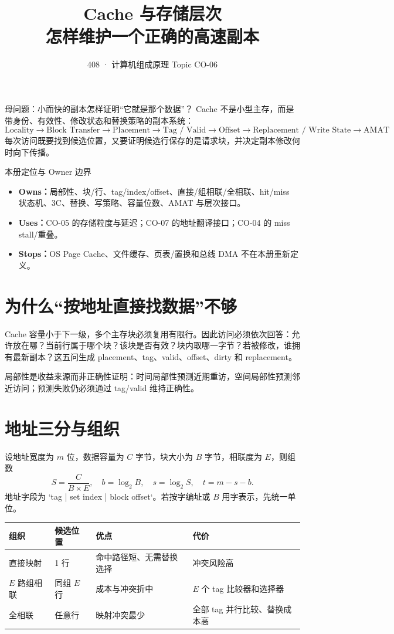 \documentclass[UTF8,fontset=fandol,11pt,a4paper]{ctexart}
\title{\vspace{-1.1cm}\textbf{Cache 与存储层次}\\[0.4em]\large 怎样维护一个正确的高速副本}
\author{408 · 计算机组成原理 Topic CO-06}\date{}
\newcommand{\kw}[1]{\textbf{\color{deep}#1}}\newcommand{\code}[1]{\texttt{#1}}
\begin{document}
\maketitle
\begin{corebox}{母问题：小而快的副本怎样证明“它就是那个数据”？}
Cache 不是小型主存，而是带身份、有效性、修改状态和替换策略的副本系统：
\[
\boxed{\text{Locality}\to\text{Block Transfer}\to\text{Placement}\to\text{Tag / Valid}\to\text{Offset}\to\text{Replacement / Write State}\to\text{AMAT}}
\]
每次访问既要找到候选位置，又要证明候选行保存的是请求块，并决定副本修改何时向下传播。
\end{corebox}
\begin{methodbox}{本册定位与 Owner 边界}
\begin{itemize}
\item \kw{Owns：}局部性、块/行、tag/index/offset、直接/组相联/全相联、hit/miss 状态机、3C、替换、写策略、容量位数、AMAT 与层次接口。
\item \kw{Uses：}CO-05 的存储粒度与延迟；CO-07 的地址翻译接口；CO-04 的 miss stall/重叠。
\item \kw{Stops：}OS Page Cache、文件缓存、页表/置换和总线 DMA 不在本册重新定义。
\end{itemize}\end{methodbox}
\tableofcontents\newpage

\section{为什么“按地址直接找数据”不够}
Cache 容量小于下一级，多个主存块必须复用有限行。因此访问必须依次回答：允许放在哪？当前行属于哪个块？该块是否有效？块内取哪一字节？若被修改，谁拥有最新副本？这五问生成 placement、tag、valid、offset、dirty 和 replacement。

局部性是收益来源而非正确性证明：时间局部性预测近期重访，空间局部性预测邻近访问；预测失败仍必须通过 tag/valid 维持正确性。

\section{地址三分与组织}
设地址宽度为 $m$ 位，数据容量为 $C$ 字节，块大小为 $B$ 字节，相联度为 $E$，则组数
\[
S=\frac{C}{B\times E},\quad b=\log_2B,\quad s=\log_2S,\quad t=m-s-b.
\]
地址字段为 `tag | set index | block offset`。若按字编址或 $B$ 用字表示，先统一单位。

\begin{center}\small\begin{tabularx}{\linewidth}{L{2.1cm}C{1.5cm}Y Y}\toprule
组织 & 候选位置 & 优点 & 代价\\\midrule
直接映射 & 1 行 & 命中路径短、无需替换选择 & 冲突风险高\\
$E$ 路组相联 & 同组 $E$ 行 & 成本与冲突折中 & $E$ 个 tag 比较器和选择器\\
全相联 & 任意行 & 映射冲突最少 & 全部 tag 并行比较、替换成本高\\
\bottomrule\end{tabularx}\end{center}
\end{document}
